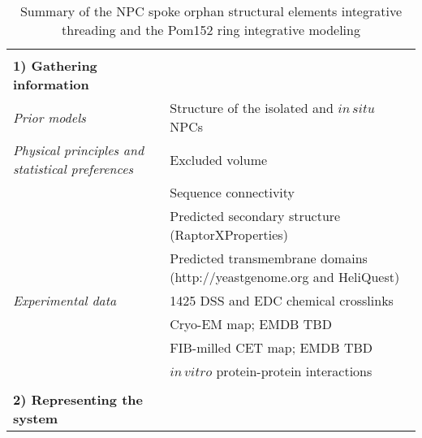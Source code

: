 \documentclass[8pt,a4paper]{article}
\begin{document}
\setcounter{table}{2}

\begin{longtable}{ p{} | p{} } 
\caption{Summary of the NPC spoke orphan structural elements integrative threading and the Pom152 ring integrative modeling}
  
  &  \\
  \textbf{1) Gathering information} & \\
    \hline

            \textit{Prior models} & Structure of the isolated and $in\, situ$ NPCs\\
                \textit{Physical principles and statistical preferences} & Excluded volume\\
            & Sequence connectivity \\
            & Predicted secondary structure (RaptorXProperties) \\
            & Predicted transmembrane domains (http://yeastgenome.org and HeliQuest) \\
                \textit{Experimental data} & 1425 DSS and EDC chemical crosslinks\\
            & Cryo-EM map; EMDB TBD \\
            & FIB-milled CET map; EMDB TBD \\
            & $in\,  vitro$ protein-protein interactions \\
          
    &  \\
    \normalsize{\textbf{2) Representing the system}} & \\
    \hline
    

\end{longtable}
\end{document}

